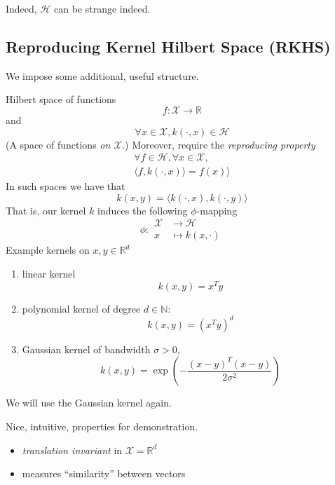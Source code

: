Indeed, $\mathcal{H}$ can be strange indeed.
\clearpage
\subsection*{Reproducing Kernel Hilbert Space (RKHS)}
We impose some additional, useful structure.

Hilbert space of functions
\begin{equation*}
f: \mathcal{X} \rightarrow \mathbb{R}
\end{equation*}
 and 
\begin{equation*}
\forall x \in \mathcal{X}, k(\cdot, x) \in \mathcal{H}
\end{equation*}
(A space of functions \emph{on} $\mathcal{X}$.)
\clearpage
Moreover,  require the \emph{reproducing property}
\begin{align*}
\forall f \in \mathcal{H}, \forall x \in \mathcal{X},\\
\langle f, k(\cdot,x)\rangle = f(x)\rangle
\end{align*}
In such spaces we have that 
\begin{equation*}
k(x,y) = \langle k(\cdot, x), k(\cdot, y) \rangle
\end{equation*}
\clearpage
That is, our kernel $k$ induces the following $\phi$-mapping
\begin{equation*}
\phi: \begin{matrix}
        \mathcal{X}  &\rightarrow \mathcal{H}\\
        x &\mapsto k(x,\cdot)
        \end{matrix}
\end{equation*}
\clearpage
Example kernels on $x, y \in \mathbb{R}^d$
\begin{enumerate}
\item linear kernel \[k(x, y) = x^Ty\]
\item polynomial kernel of degree $d\in \mathbb{N}$: \[k(x, y) = (x^Ty)^d\]
\item Gaussian kernel of bandwidth $\sigma>0$, \[k(x,y) = \exp\left(-\frac{(x-y)^T(x-y)}{2\sigma^2}\right)\]
\end{enumerate}
\clearpage
We will use the Gaussian kernel again.

Nice, intuitive, properties for demonstration.

\begin{itemize}
\item \emph{translation invariant} in $\mathcal{X}=\mathbb{R}^d$
\item measures ``similarity'' between vectors
\end{itemize}
\clearpage
